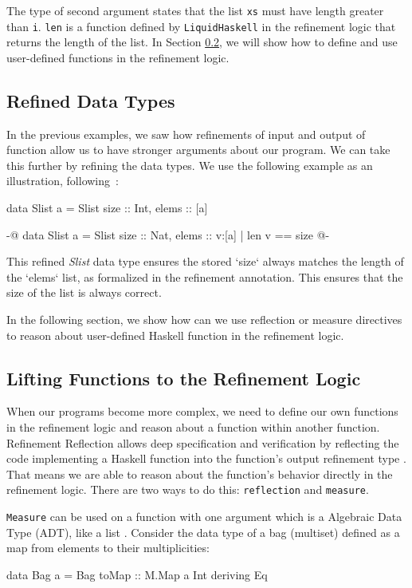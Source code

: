 The type of second argument states that the list \texttt{xs} must have length greater than \texttt{i}.
\texttt{len} is a function defined by \texttt{LiquidHaskell} in the refinement logic that returns the length of the list.
In Section \ref{sec:reflection}, we will show how to define and use user-defined functions in the refinement logic.

\subsection{Refined Data Types}
In the previous examples, we saw how refinements of input and output of function allow us to have stronger arguments about our program.
We can take this further by refining the data types.
We use the following example as an illustration, following~\cite{jhala2020}:
\begin{code}
	data Slist a = Slist { size :: Int, elems :: [a] }

	{-@ data Slist a = Slist { size :: Nat, elems :: {v:[a] | len v == size} } @-}
\end{code}

This refined \textit{Slist} data type ensures the stored `size` always matches the length of the `elems` list,
as formalized in the refinement annotation.
This ensures that the size of the list is always correct.

In the following section, we show how can we use reflection or measure directives to reason about user-defined Haskell function in the refinement logic.

\subsection{Lifting Functions to the Refinement Logic}
\label{sec:reflection}
When our programs become more complex, we need to define our own functions in the refinement logic and reason about
a function within another function. Refinement Reflection allows deep specification and verification by
reflecting the code implementing a Haskell function into the function’s output refinement type \cite{vazou2018}.
That means we are able to reason about the function's behavior directly in the refinement logic.
There are two ways to do this: \texttt{reflection} and \texttt{measure}.

\texttt{Measure} can be used on a function with one argument which is a Algebraic Data Type (ADT), like a list \cite{niki_lecture_2024}.
Consider the data type of a bag (multiset) defined as a map from elements to their multiplicities:
\begin{code}
	data Bag a = Bag { toMap :: M.Map a Int } deriving Eq
\end{code}

